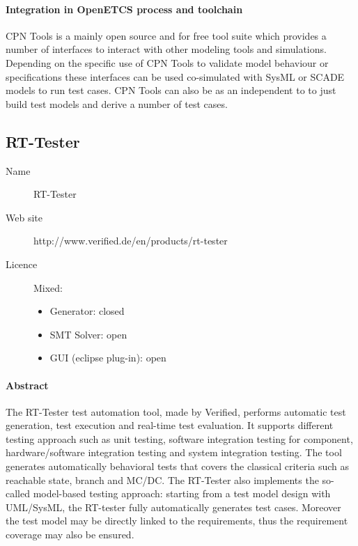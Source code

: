 \paragraph{Integration in OpenETCS process and toolchain}

CPN Tools is a mainly open source and for free tool suite which provides a number of interfaces to interact with other modeling tools and simulations. Depending on the specific use of CPN Tools to validate model behaviour or specifications these interfaces can be used co-simulated with SysML or SCADE models to run test cases. CPN Tools can also be as an independent to to just build test models and derive a number of test cases. 

\subsection{RT-Tester}
\label{sec:RT-Tester}

\begin{description}
\item[Name] RT-Tester
\item[Web site] http://www.verified.de/en/products/rt-tester
\item[Licence] Mixed:
  \begin{itemize}
    \item Generator:  closed
    \item SMT Solver: open
    \item GUI (eclipse plug-in): open
  \end{itemize}
\end{description}

\paragraph{Abstract}
The RT-Tester test automation tool, made by Verified, performs
automatic test generation, test execution and real-time test
evaluation.  It supports different testing approach such as unit
testing, software integration testing for component, hardware/software
integration testing and system integration testing.  
The tool generates automatically behavioral tests that covers the
classical criteria such as  reachable state, branch and MC/DC.
The RT-Tester also implements the so-called  model-based testing approach: 
starting from a test model design with UML/SysML, the RT-tester fully
automatically generates test cases. Moreover the test model may be
directly linked to the requirements, thus the requirement coverage may
also be ensured.

